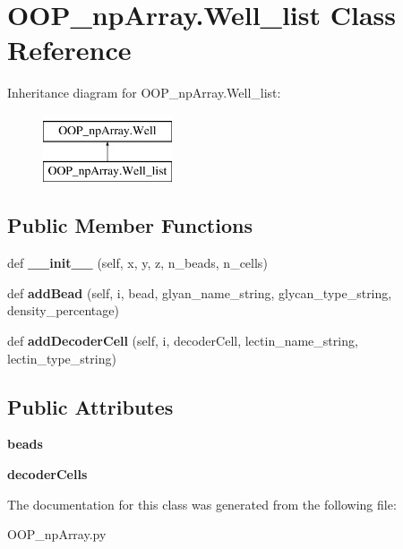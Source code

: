 \hypertarget{class_o_o_p__np_array_1_1_well__list}{}\section{O\+O\+P\+\_\+np\+Array.\+Well\+\_\+list Class Reference}
\label{class_o_o_p__np_array_1_1_well__list}
Inheritance diagram for O\+O\+P\+\_\+np\+Array.\+Well\+\_\+list\+:\begin{figure}[H]
\begin{center}
\leavevmode
\includegraphics[height=2.000000cm]{class_o_o_p__np_array_1_1_well__list}
\end{center}
\end{figure}
\subsection*{Public Member Functions}
\begin{DoxyCompactItemize}
\item 
\mbox{\label{class_o_o_p__np_array_1_1_well__list_a34452e04bc0aa035ca3049b2a4cbe5bd}} 
def {\bfseries \+\_\+\+\_\+init\+\_\+\+\_\+} (self, x, y, z, n\+\_\+beads, n\+\_\+cells)
\item 
\mbox{\label{class_o_o_p__np_array_1_1_well__list_ae0961c99dd36f4417bc5c7f3cfe81b67}} 
def {\bfseries add\+Bead} (self, i, bead, glyan\+\_\+name\+\_\+string, glycan\+\_\+type\+\_\+string, density\+\_\+percentage)
\item 
\mbox{\label{class_o_o_p__np_array_1_1_well__list_a4faff6c708781f38124239448043117c}} 
def {\bfseries add\+Decoder\+Cell} (self, i, decoder\+Cell, lectin\+\_\+name\+\_\+string, lectin\+\_\+type\+\_\+string)
\end{DoxyCompactItemize}
\subsection*{Public Attributes}
\begin{DoxyCompactItemize}
\item 
\mbox{\label{class_o_o_p__np_array_1_1_well__list_a5155967229f404a247799167c5c637a5}} 
{\bfseries beads}
\item 
\mbox{\label{class_o_o_p__np_array_1_1_well__list_ab5516771f8d44ae1c00b78abf101d5a6}} 
{\bfseries decoder\+Cells}
\end{DoxyCompactItemize}


The documentation for this class was generated from the following file\+:\begin{DoxyCompactItemize}
\item 
O\+O\+P\+\_\+np\+Array.\+py\end{DoxyCompactItemize}
